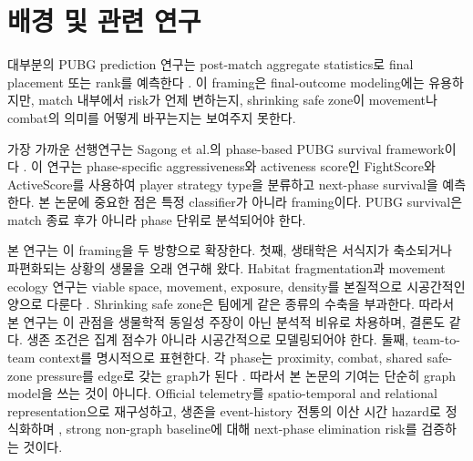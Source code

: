 \section{배경 및 관련 연구}
\label{sec:related-work}

대부분의 PUBG prediction 연구는 post-match aggregate statistics로 final placement
또는 rank를 예측한다
\cite{kagglePubgFinishPlacement,sen2021pubgFinalRank,lee2025pubgRank}. 이 framing은
final-outcome modeling에는 유용하지만, match 내부에서 risk가 언제 변하는지,
shrinking safe zone이 movement나 combat의 의미를 어떻게 바꾸는지는 보여주지
못한다.

가장 가까운 선행연구는 Sagong et al.의 phase-based PUBG survival framework이다
\cite{sagong2025hunterCamper}. 이 연구는 phase-specific aggressiveness와
activeness score인 FightScore와 ActiveScore를 사용하여 player strategy type을
분류하고 next-phase survival을 예측한다. 본 논문에 중요한 점은 특정 classifier가
아니라 framing이다. PUBG survival은 match 종료 후가 아니라 phase 단위로 분석되어야
한다.

본 연구는 이 framing을 두 방향으로 확장한다. 첫째, 생태학은 서식지가 축소되거나
파편화되는 상황의 생물을 오래 연구해 왔다. Habitat fragmentation과 movement
ecology 연구는 viable space, movement, exposure, density를 본질적으로 시공간적인
양으로 다룬다 \cite{fahrig2003fragmentation,nathan2008movement}. Shrinking safe
zone은 팀에게 같은 종류의 수축을 부과한다. 따라서 본 연구는 이 관점을 생물학적
동일성 주장이 아닌 분석적 비유로 차용하며, 결론도 같다. 생존 조건은 집계 점수가
아니라 시공간적으로 모델링되어야 한다. 둘째, team-to-team
context를 명시적으로 표현한다. 각 phase는 proximity, combat, shared safe-zone
pressure를 edge로 갖는 graph가 된다 \cite{sanchezLengeling2021gnnIntro}. 따라서
본 논문의 기여는 단순히 graph model을 쓰는 것이 아니다. Official telemetry를
spatio-temporal and relational representation으로 재구성하고, 생존을
event-history 전통의 이산 시간 hazard로 정식화하며
\cite{allison1982discrete,singer1993discrete}, strong non-graph baseline에
대해 next-phase elimination risk를 검증하는 것이다.
